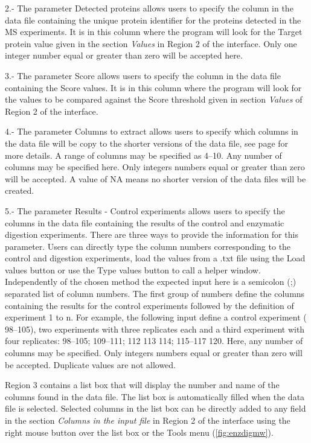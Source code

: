 \num{2}.- The parameter Detected proteins allows users to specify the column in the data file containing the unique protein identifier for the proteins detected in the MS experiments. It is in this column where the program will look for the Target protein value given in the section \textit{Values} in Region \num{2} of the interface. Only one integer number equal or greater than zero will be accepted here.

\num{3}.- The parameter Score allows users to specify the column in the data file containing the Score values. It is in this column where the program will look for the values to be compared against the Score threshold given in section \textit{Values} of Region \num{2} of the interface.

\num{4}.- The parameter Columns to extract\label{par:enzdigColExt} allows users to specify which columns in the data file will be copy to the shorter versions of the data file, see page \pageref{par:datafilesenzdig} for more details. A range of columns may be specified as \numrange[range-phrase = --]{4}{10}. Any number of columns may be specified here. Only integers numbers equal or greater than zero will be accepted. A value of NA means no shorter version of the data files will be created.

\num{5}.- \label{par:results}The parameter Results - Control experiments allows users to specify the columns in the data file containing the results of the control and enzymatic digestion experiments. There are three ways to provide the information for this parameter. Users can directly type the column numbers corresponding to the control and digestion experiments, load the  values from a .txt file using the Load values button or use the Type values button to call a helper window. Independently of the chosen method the expected input here is a semicolon (;) separated list of column numbers. The first group of numbers define the columns containing the results for the control experiments followed by the definition of experiment \num{1} to n. For example, the following input define a control experiment ( \numrange[range-phrase = --]{98}{105}), two experiments with three replicates each and a third experiment with four replicates: \numrange[range-phrase = --]{98}{105}; \numrange[range-phrase = --]{109}{111}; 112 113 114; \numrange[range-phrase = --]{115}{117} 120. Here, any number of columns may be specified. Only integers numbers equal or greater than zero will be accepted. Duplicate values are not allowed.

Region \num{3} contains a list box that will display the number and name of the columns found in the data file. The list box is automatically filled when the data file is selected. Selected columns in the list box can be directly added to any field in the section \textit{Columns in the input file} in Region \num{2} of the interface using the right mouse button over the list box or the Tools menu (\autoref{fig:enzdigmw}).

